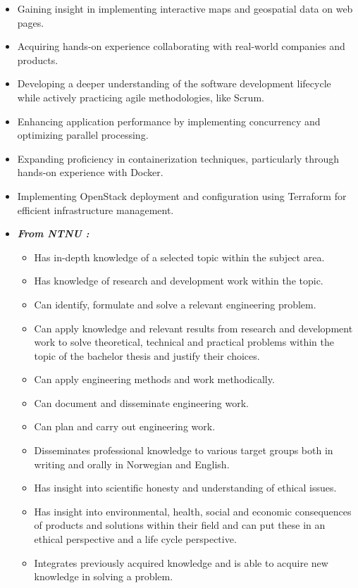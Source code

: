 \begin{itemize}
    \item Gaining insight in implementing interactive maps and geospatial data on web pages.
    \item Acquiring hands-on experience collaborating with real-world companies and products.
    \item Developing a deeper understanding of the software development lifecycle while actively practicing agile methodologies, like Scrum.
    \item Enhancing application performance by implementing concurrency and optimizing parallel processing.
    \item Expanding proficiency in containerization techniques, particularly through hands-on experience with Docker.
    \item Implementing OpenStack deployment and configuration using Terraform for efficient infrastructure management.
    \item \textit{\textbf{From NTNU \cite{ntnu_idatg2900}:}}
    \begin{itemize}
        \item Has in-depth knowledge of a selected topic within the subject area.
        \item Has knowledge of research and development work within the topic.
        \item Can identify, formulate and solve a relevant engineering problem.
        \item Can apply knowledge and relevant results from research and development work to solve theoretical, technical and practical problems within the topic of the bachelor thesis and justify their choices.
        \item Can apply engineering methods and work methodically.
        \item Can document and disseminate engineering work.
        \item Can plan and carry out engineering work.
        \item Disseminates professional knowledge to various target groups both in writing and orally in Norwegian and English.
        \item Has insight into scientific honesty and understanding of ethical issues.
        \item Has insight into environmental, health, social and economic consequences of products and solutions within their field and can put these in an ethical perspective and a life cycle perspective.
        \item Integrates previously acquired knowledge and is able to acquire new knowledge in solving a problem.
    \end{itemize}
\end{itemize}

